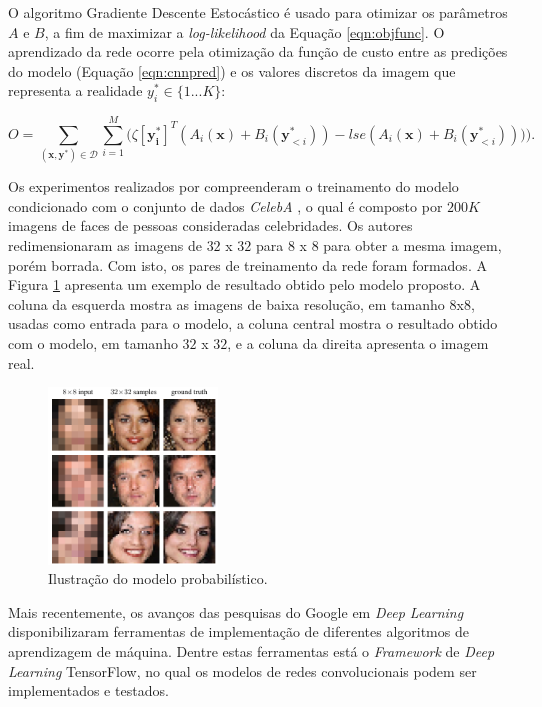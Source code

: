 O algoritmo Gradiente Descente Estocástico é usado para otimizar os parâmetros $A$ e $B$, a fim de maximizar
a \textit{log-likelihood} da Equação \ref{eqn:objfunc}. O aprendizado da rede ocorre pela otimização da função de custo entre
as predições do modelo (Equação \ref{eqn:cnnpred}) e os valores discretos da imagem que representa
a realidade $y_i^* \in \{1...K\}$:

\begin{equation}
\label{eqn:cnncostfunc}
O = \sum_{(\boldsymbol{x},\boldsymbol{y^*})\in \mathcal{D}} \sum_{i=1}^{M}\big(\zeta [\boldsymbol{y_i^*}]^T(A_i(\boldsymbol{x}) + B_i(\boldsymbol{y}_{<i}^*))
-lse(A_i(\boldsymbol{x}) + B_i(\boldsymbol{y}_{<i}^*))) \big).
\end{equation}

Os experimentos realizados por \cite{DahlNS17} compreenderam o treinamento do modelo condicionado
com o conjunto de dados \textit{CelebA} \citep{liu15}, o qual é composto por $200K$ imagens de
faces de pessoas consideradas celebridades. Os autores redimensionaram as imagens de
$32$ x $32$ para $8$ x $8$ para obter a mesma imagem, porém borrada. Com isto, os
pares de treinamento da rede foram formados. A Figura \ref{fig:example1} apresenta um exemplo
de resultado obtido pelo modelo proposto. A coluna da esquerda mostra as imagens de baixa
resolução, em tamanho $8$x$8$, usadas como entrada para o modelo, a coluna central mostra o
resultado obtido com o modelo, em tamanho $32$ x $32$, e a coluna da direita apresenta o imagem
real.
\begin{figure}[ht!]
\begin{center}
  \includegraphics[width=0.4\textwidth]{fig/example_superres_1}
  \caption{Ilustração do modelo probabilístico. \citep{DahlNS17}}
  \label{fig:example1}
\end{center}
\end{figure}

Mais recentemente, os avanços das pesquisas do Google em \textit{Deep Learning} disponibilizaram
ferramentas de implementação de diferentes algoritmos de aprendizagem de máquina. Dentre estas
ferramentas está o \textit{Framework} de \textit{Deep Learning} TensorFlow, no qual os modelos
de redes convolucionais podem ser implementados e testados.


